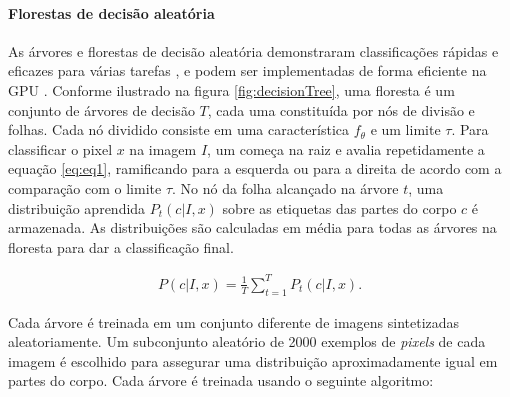 \paragraph{Florestas de decisão aleatória }\label{sec:forests}

As árvores e florestas de decisão aleatória \cite{quinlan1986induction, shepherd1983appraisal, amit1997shape, breiman2001random} demonstraram classificações rápidas e eficazes para várias tarefas \cite{lepetit2005randomized, moosmann2007fast, shotton2008semantic}, e podem ser implementadas de forma eficiente na GPU \cite{sharp2008implementing}. Conforme ilustrado na figura \ref{fig:decisionTree}, uma floresta é um conjunto de árvores de decisão $T$, cada uma constituída por nós de divisão e folhas. Cada nó dividido consiste em uma característica ${f_{\theta}}$ e um limite $\tau$. Para classificar o pixel $x$ na imagem $I$, um começa na raiz e avalia repetidamente a equação \ref{eq:eq1}, ramificando para a esquerda ou para a direita de acordo com a comparação com o limite $\tau$. No nó da folha alcançado na árvore $t$, uma distribuição aprendida $P_{t} (c | I, x)$ sobre as etiquetas das partes do corpo $c$ é armazenada. As distribuições são calculadas em média para todas as árvores na floresta para dar a classificação final.

\begin{align}
P(c | I, x) = \frac{1}{T} \sum_{t=1}^{T} P_{t} (c | I, x).
\label{eq:eq2}
\end{align}

Cada árvore é treinada em um conjunto diferente de imagens sintetizadas aleatoriamente. Um subconjunto aleatório de 2000 exemplos de \textit{pixels} de cada imagem é escolhido para assegurar uma distribuição aproximadamente igual em partes do corpo. Cada árvore é treinada usando o seguinte algoritmo: 

